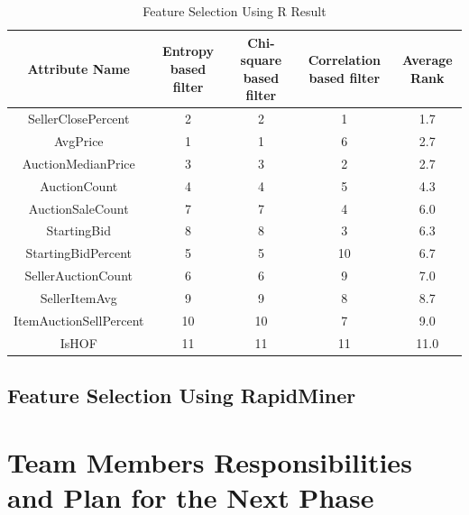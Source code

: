 \documentclass[CEJM,PDF]{cej} %
\begin{document}
\begin{table}[h]
\centering
\caption{Feature Selection Using R Result}
\label{r-rank}
\begin{tabular}{@{}ccccc@{}}
\toprule
Attribute Name         & Entropy based filter & Chi-square based filter & Correlation based filter & Average Rank \\ \midrule
SellerClosePercent     & 2                    & 2                       & 1                        & 1.7     \\
AvgPrice               & 1                    & 1                       & 6                        & 2.7     \\
AuctionMedianPrice     & 3                    & 3                       & 2                        & 2.7     \\
AuctionCount           & 4                    & 4                       & 5                        & 4.3     \\
AuctionSaleCount       & 7                    & 7                       & 4                        & 6.0     \\
StartingBid            & 8                    & 8                       & 3                        & 6.3     \\
StartingBidPercent     & 5                    & 5                       & 10                       & 6.7     \\
SellerAuctionCount     & 6                    & 6                       & 9                        & 7.0     \\
SellerItemAvg          & 9                    & 9                       & 8                        & 8.7     \\
ItemAuctionSellPercent & 10                   & 10                      & 7                        & 9.0     \\
IsHOF                  & 11                   & 11                      & 11                       & 11.0    \\ \bottomrule
\end{tabular}
\end{table}


\subsection{Feature Selection Using RapidMiner}

\section{Team Members Responsibilities and Plan for the Next Phase}
\end{document}
